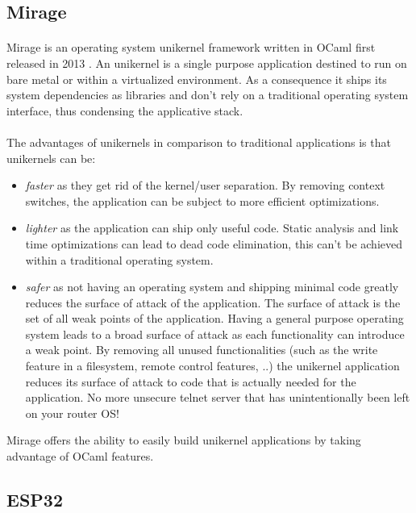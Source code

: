 \documentclass[a4paper]{article}
\begin{document}
\subsection{Mirage}
\paragraph{}
Mirage is an operating system unikernel framework written in OCaml first released in 2013 \cite{madhavapeddy2013unikernels}. An unikernel is a single purpose application destined to 
run on bare metal or within a virtualized environment. As a consequence it ships its system dependencies as libraries and don't rely on a traditional operating 
system interface, thus condensing the applicative stack. 
\paragraph{}
The advantages of unikernels in comparison to traditional applications is that unikernels can be:
\begin{itemize}
    \item \textit{faster} as they get rid of the kernel/user separation. By removing context switches, the application can be subject to more efficient optimizations.
    \item \textit{lighter} as the application can ship only useful code. Static analysis and link time optimizations can lead to dead code elimination, 
    this can't be achieved within a traditional operating system.
    \item \textit{safer} as not having an operating system and shipping minimal code greatly reduces the surface of attack of the application. 
    The surface of attack is the set of all weak points of the application. Having a general purpose operating system leads to a broad surface of 
    attack as each functionality can introduce a weak point. By removing all unused functionalities (such as the write feature in a filesystem, 
    remote control features, ..) the unikernel application reduces its surface of attack to code that is actually needed for the application. 
    No more unsecure telnet server that has unintentionally been left on your router OS!
\end{itemize}
Mirage offers the ability to easily build unikernel applications by taking advantage of OCaml features. 
\subsection{ESP32}
\end{document}
